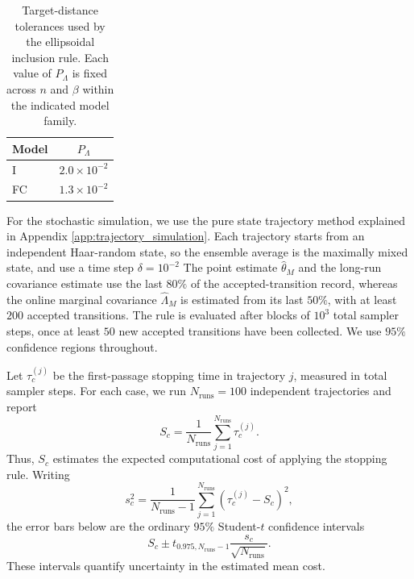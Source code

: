 \documentclass[showpacs,amsmath,amssymb,twocolumn,prx,superscriptaddress,10pt,aps,nofootinbib]{revtex4-2}
\begin{document}
\begin{table}[t]
    \centering
    \caption{
        Target-distance tolerances used by the ellipsoidal inclusion rule. Each value of $P_\Lambda$ is fixed across $n$ and $\beta$ within the indicated model family.
    }
    \label{tab:stopping_tolerances}
    \begin{tabular}{lc}
        \hline\hline
        Model &$P_\Lambda$\\
        \hline
        I  &$2.0\times10^{-2}$\\
        FC &$1.3\times10^{-2}$\\
        \hline\hline
    \end{tabular}
\end{table}
For the stochastic simulation, we use the pure state trajectory method explained in Appendix \ref{app:trajectory_simulation}. Each trajectory starts from an independent Haar-random state, so the ensemble average is the maximally mixed state, and use a time step $\delta = 10^{-2}$ The point estimate $\widehat{\theta}_M$ and the long-run covariance estimate use the last $80\%$ of the accepted-transition record, whereas the online marginal covariance $\widehat{\Lambda}_M$ is estimated from its last $50\%$, with at least $200$ accepted transitions. The rule is evaluated after blocks of $10^3$ total sampler steps, once at least $50$ new accepted transitions have been collected. We use $95\%$ confidence regions throughout.

Let $\tau_c^{(j)}$ be the first-passage stopping time in trajectory $j$, measured in total sampler steps. For each case, we run $N_{\mathrm{runs}}=100$ independent trajectories and report
\begin{equation}
    S_c
    =
    \frac{1}{N_{\mathrm{runs}}}
    \sum_{j=1}^{N_{\mathrm{runs}}}
    \tau_c^{(j)}.
    \label{eq:mean_stopping_cost}
\end{equation}
Thus, $S_c$ estimates the expected computational cost of applying the stopping rule. Writing
\begin{equation}
    s_c^2
    =
    \frac{1}{N_{\mathrm{runs}}-1}
    \sum_{j=1}^{N_{\mathrm{runs}}}
    \left(\tau_c^{(j)}-S_c\right)^2,
\end{equation}
the error bars below are the ordinary $95\%$ Student-$t$ confidence intervals
\begin{equation}
    S_c
    \pm
    t_{0.975,N_{\mathrm{runs}}-1}
    \frac{s_c}{\sqrt{N_{\mathrm{runs}}}}.
    \label{eq:mean_stopping_cost_ci}
\end{equation}
These intervals quantify uncertainty in the estimated mean cost.
\end{document}

